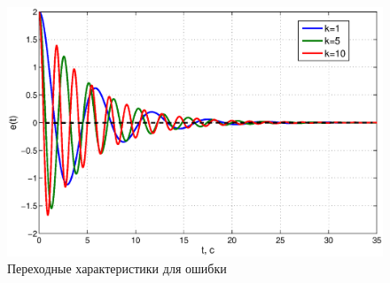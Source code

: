 \documentclass[12pt,a4paper]{article}
\begin{document}
\begin{figure}[H]
	\centering
	\includegraphics[width=1\linewidth]{2.1.2.eps}
	\caption{Переходные характеристики для ошибки}
\end{figure}
\end{document}
